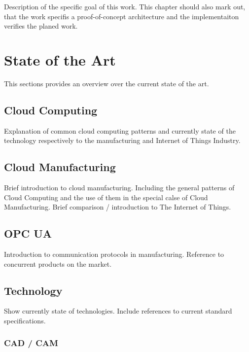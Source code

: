\documentclass[
a4paper,
twoside,
bibliography=totoc,
headsepline,
cleardoublepage=empty,
parskip=half,
draft=false
]{scrbook}
\begin{document}
			Description of the specific goal of this work. This chapter should also mark out, that the work specifis a proof-of-concept architecture and the implementaiton verifies the planed work.
		
	\chapter{State of the Art} \label{ch:state_of_the_art}
	
		This sections provides an overview over the current state of the art.
		
		\section{Cloud Computing} \label{sec:cloud_computing}
		
			Explanation of common cloud computing patterns and currently state of the technology respectively to the manufacturing and Internet of Things Industry.
		
		\section{Cloud Manufacturing} \label{sec:cloud_manufacturing}
		
			Brief introduction to cloud manufacturing. Including the general patterns of Cloud Computing and the use of them in the special calse of Cloud Manufacturing. Brief comparison / introduction to The Internet of Things.
			
		\section{OPC UA} \label{sec:opc_ua}
		
			Introduction to communication protocols in manufacturing. Reference to concurrent products on the market.
				
		\section{Technology} \label{sec:technology}
		
			Show currently state of technologies. Include references to current standard specifications.
			
				\subsection{CAD / CAM} \label{subsec:cad_cam}
				
\end{document}
